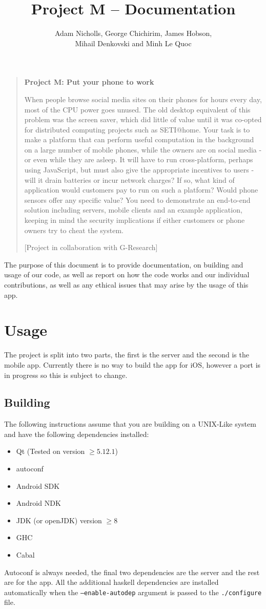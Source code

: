 \documentclass{article}
\title{Project M -- Documentation}
\author{Adam Nicholls, George Chichirim, James Hobson, \\ Mihail Denkovski and Minh Le Quoc}
\begin{document}
\maketitle
\begin{quote}
  \textbf{Project M: Put your phone to work}

When people browse social media sites on their phones for hours every day, most of the CPU power goes unused. The old desktop equivalent of this problem was the screen saver, which did little of value until it was co-opted for distributed computing projects such as SETI@home. Your task is to make a platform that can perform useful computation in the background on a large number of mobile phones, while the owners are on social media - or even while they are asleep. It will have to run cross-platform, perhaps using JavaScript, but must also give the appropriate incentives to users - will it drain batteries or incur network charges? If so, what kind of application would customers pay to run on such a platform? Would phone sensors offer any specific value? You need to demonstrate an end-to-end solution including servers, mobile clients and an example application, keeping in mind the security implications if either customers or phone owners try to cheat the system.

[Project in collaboration with G-Research]
\end{quote}
The purpose of this document is to provide documentation, on building and usage of our code, as well as report on how the
code works and our individual contributions, as well as any ethical issues that may arise by the usage of this app.
\tableofcontents
\section{Usage}
The project is split into two parts, the first is the server and the second is the mobile app. Currently there is no way
to build the app for iOS, however a port is in progress so this is subject to change.
\subsection{Building}
The following instructions assume that you are building on a UNIX-Like system and have the following dependencies installed:
\begin{itemize}
  \item{Qt (Tested on version \(\geq 5.12.1\))}
  \item{autoconf}
  \item{Android SDK}
  \item{Android NDK}
  \item{JDK (or openJDK) version \(\geq 8\)}
  \item{GHC}
  \item{Cabal}
\end{itemize}
Autoconf is always needed, the final two dependencies are the server and the rest are for the app. All the additional haskell dependencies are installed
automatically when the \texttt{--enable-autodep} argument is passed to the \texttt{./configure} file.
\end{document}
